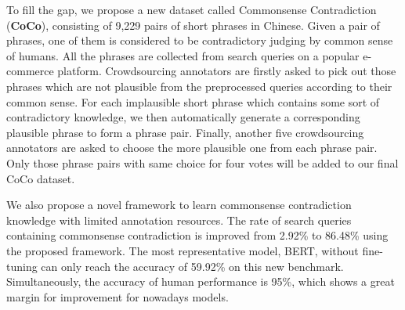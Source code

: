 To fill the gap, we propose a new dataset called Commonsense Contradiction (\textbf{CoCo}), consisting of 9,229 pairs of short phrases in Chinese. 
Given a pair of phrases, one of them is considered to be contradictory judging by common sense of humans.
All the phrases are collected from search queries on a popular e-commerce platform.
Crowdsourcing annotators are firstly asked to pick out those phrases which are not plausible from the preprocessed queries
according to their common sense. 
For each implausible short phrase which contains some sort of contradictory knowledge,
we then automatically generate a corresponding plausible phrase to form a phrase pair. 
Finally, another five crowdsourcing annotators are asked to choose the more plausible one from each phrase pair. 
Only those phrase pairs with same choice for four votes will be added to our final CoCo dataset. 

We also propose a novel framework to learn commonsense contradiction knowledge with limited annotation resources.
The rate of search queries containing commonsense contradiction is improved from 2.92\% to 86.48\% using the proposed framework.
The most representative model, BERT,  without fine-tuning can only reach the accuracy of 59.92\% on this new benchmark.
Simultaneously, the accuracy of human performance is 95\%, which shows a great margin for improvement for nowadays models.




